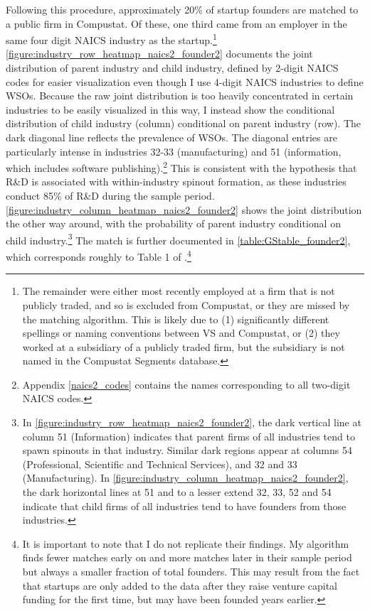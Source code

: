 \documentclass[ecta,nameyear,final]{econsocart}
\theoremstyle{plain}
\theoremstyle{remark}
\begin{document}
Following this procedure, approximately 20\% of startup founders are matched to a public firm in Compustat. Of these, one third came from an employer in the same four digit NAICS industry as the startup.\footnote{The remainder were either most recently employed at a firm that is not publicly traded, and so is excluded from Compustat, or they are missed by the matching algorithm. This is likely due to (1) significantly different spellings or naming conventions between VS and Compustat, or (2) they worked at a subsidiary of a publicly traded firm, but the subsidiary is not named in the Compustat Segments database.} \autoref{figure:industry_row_heatmap_naics2_founder2} documents the joint distribution of parent industry and child industry, defined by 2-digit NAICS codes for easier visualization even though I use 4-digit NAICS industries to define WSOs. Because the raw joint distribution is too heavily concentrated in certain industries to be easily visualized in this way, I instead show the conditional distribution of child industry (column) conditional on parent industry (row). The dark diagonal line reflects the prevalence of WSOs. The diagonal entries are particularly intense in industries 32-33 (manufacturing) and 51 (information, which includes software publishing).\footnote{Appendix \autoref{naics2_codes} contains the names corresponding to all two-digit NAICS codes.} This is consistent with the hypothesis that R\&D is associated with within-industry spinout formation, as these industries conduct 85\% of R\&D during the sample period. \autoref{figure:industry_column_heatmap_naics2_founder2} shows the joint distribution the other way around, with the probability of parent industry conditional on child industry.\footnote{In \autoref{figure:industry_row_heatmap_naics2_founder2}, the dark vertical line at column 51 (Information) indicates that parent firms of all industries tend to spawn spinouts in that industry. Similar dark regions appear at columns 54 (Professional, Scientific and Technical Services), and 32 and 33 (Manufacturing). In \autoref{figure:industry_column_heatmap_naics2_founder2}, the dark horizontal lines at 51 and to a lesser extend 32, 33, 52 and 54 indicate that child firms of all industries tend to have founders from those industries.} The match is further documented in \autoref{table:GStable_founder2}, which corresponds roughly to Table 1 of \cite{gompers_entrepreneurial_2005}.\footnote{It is important to note that I do not replicate their findings. My algorithm finds fewer matches early on and more matches later in their sample period but always a smaller fraction of total founders. This may result from the fact that startups are only added to the data after they raise venture capital funding for the first time, but may have been founded years earlier.} 
\end{document}
